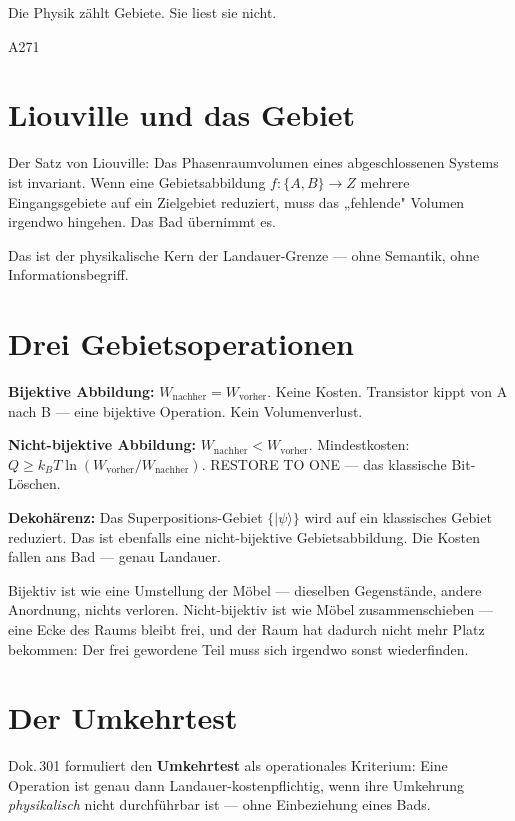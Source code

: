 \label{ch:landauer_phasenraum}

\epigraph{Die Physik zählt Gebiete. Sie liest sie nicht.}{A271}

\section{Liouville und das Gebiet}

Der Satz von Liouville: Das Phasenraumvolumen eines abgeschlossenen Systems
ist invariant. Wenn eine Gebietsabbildung $f: \{A, B\} \to Z$ mehrere
Eingangsgebiete auf ein Zielgebiet reduziert, muss das „fehlende" Volumen
irgendwo hingehen. Das Bad übernimmt es. 

Das ist der physikalische Kern der Landauer-Grenze --- ohne Semantik,
ohne Informationsbegriff.

\section{Drei Gebietsoperationen}

\textbf{Bijektive Abbildung:} $W_{\text{nachher}} = W_{\text{vorher}}$.
Keine Kosten. Transistor kippt von A nach B --- eine bijektive Operation.
Kein Volumenverlust. 

\textbf{Nicht-bijektive Abbildung:} $W_{\text{nachher}} < W_{\text{vorher}}$.
Mindestkosten: $Q \ge k_BT \ln(W_{\text{vorher}}/W_{\text{nachher}})$.
RESTORE TO ONE --- das klassische Bit-Löschen. 

\textbf{Dekohärenz:} Das Superpositions-Gebiet $\{|\psi\rangle\}$ wird auf
ein klassisches Gebiet reduziert. Das ist ebenfalls eine nicht-bijektive
Gebietsabbildung. Die Kosten fallen ans Bad --- genau Landauer. 

\begin{laierspur}
Bijektiv ist wie eine Umstellung der Möbel --- dieselben Gegenstände,
andere Anordnung, nichts verloren. Nicht-bijektiv ist wie Möbel
zusammenschieben --- eine Ecke des Raums bleibt frei, und der Raum
hat dadurch nicht mehr Platz bekommen: Der frei gewordene Teil
muss sich irgendwo sonst wiederfinden.
\end{laierspur}

\section{Der Umkehrtest}

Dok.\,301 formuliert den \textbf{Umkehrtest} als operationales Kriterium:
Eine Operation ist genau dann Landauer-kostenpflichtig, wenn ihre Umkehrung
\emph{physikalisch} nicht durchführbar ist --- ohne Einbeziehung eines Bads.

